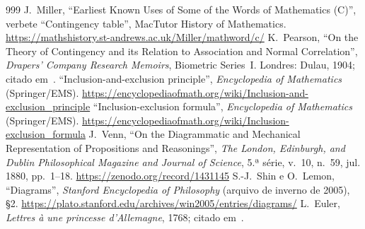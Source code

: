\begin{thebibliography}{999}
 J.~Miller, \enquote{Earliest Known Uses of Some of the Words of Mathematics (C)}, verbete \enquote{Contingency table}, MacTutor History of Mathematics. \url{https://mathshistory.st-andrews.ac.uk/Miller/mathword/c/}
 K.~Pearson, \enquote{On the Theory of Contingency and its Relation to Association and Normal Correlation}, \emph{Drapers' Company Research Memoirs}, Biometric Series~I. Londres: Dulau, 1904; citado em~\cite{millerC}.
 \enquote{Inclusion-and-exclusion principle}, \emph{Encyclopedia of Mathematics} (Springer/EMS). \url{https://encyclopediaofmath.org/wiki/Inclusion-and-exclusion_principle}
 \enquote{Inclusion-exclusion formula}, \emph{Encyclopedia of Mathematics} (Springer/EMS). \url{https://encyclopediaofmath.org/wiki/Inclusion-exclusion_formula}
 J.~Venn, \enquote{On the Diagrammatic and Mechanical Representation of Propositions and Reasonings}, \emph{The London, Edinburgh, and Dublin Philosophical Magazine and Journal of Science}, 5.ª série, v.~10, n.~59, jul. 1880, pp.~1--18. \url{https://zenodo.org/record/1431145}
 S.-J.~Shin e O.~Lemon, \enquote{Diagrams}, \emph{Stanford Encyclopedia of Philosophy} (arquivo de inverno de 2005), §2. \url{https://plato.stanford.edu/archives/win2005/entries/diagrams/}
 L.~Euler, \emph{Lettres à une princesse d'Allemagne}, 1768; citado em~\cite{sepDiagrams}.
\end{thebibliography}
\endgroup
